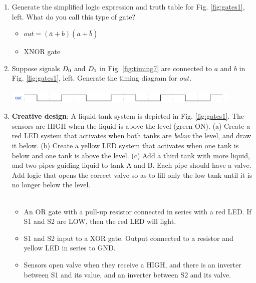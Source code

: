 \documentclass[10pt]{article}
\begin{document}
\begin{enumerate}
\item Generate the simplified logic expression and truth table for Fig. \ref{fig:gates1}, left.  What do you call this type of gate?
\begin{itemize}
\item $out = (\bar{a}+b)(a+\bar{b})$
\item XNOR gate
\end{itemize}
\item Suppose signals $D_{\rm 0}$ and $D_{\rm 1}$ in Fig. \ref{fig:timing7} are connected to $a$ and $b$ in Fig. \ref{fig:gates1}, left.  Generate the timing diagram for $out$. \\ \\ 
\includegraphics[width=0.9\textwidth]{timingExample8.pdf}
\item \textbf{Creative design}: A liquid tank system is depicted in Fig. \ref{fig:gates1}.  The sensors are HIGH when the liquid is above the level (green ON).  (a) Create a red LED system that activates when both tanks are \textit{below} the level, and draw it below.  (b) Create a yellow LED system that activates when one tank is below and one tank is above the level.  (c) Add a third tank with more liquid, and two pipes guiding liquid to tank A and B.  Each pipe should have a valve.  Add logic that opens the correct valve so as to fill only the low tank until it is no longer below the level.  \\ \\
\begin{itemize}
\item An OR gate with a pull-up resistor connected in series with a red LED.  If S1 and S2 are LOW, then the red LED will light.
\item S1 and S2 input to a XOR gate.  Output connected to a resistor and yellow LED in series to GND.
\item Sensors open valve when they receive a HIGH, and there is an inverter between S1 and its value, and an inverter between S2 and its valve.
\end{itemize}
\end{enumerate}

\clearpage
\end{document}
